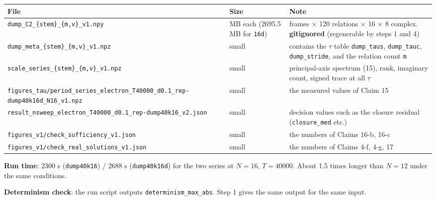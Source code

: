 \documentclass[
  10pt,
]{article}
\newcounter{none} %
\begin{document}
{\def\LTcaptype{none} %
\begin{longtable}[]{@{}
  >{\raggedright\arraybackslash}p{}
  >{\raggedright\arraybackslash}p{}
  >{\raggedright\arraybackslash}p{}@{}}
\toprule\noalign{}
\begin{minipage}[b]{\linewidth}\raggedright
File
\end{minipage} & \begin{minipage}[b]{\linewidth}\raggedright
Size
\end{minipage} & \begin{minipage}[b]{\linewidth}\raggedright
Note
\end{minipage} \\
\midrule\noalign{}
\endhead
\bottomrule\noalign{}
\endlastfoot
\texttt{dump\_C2\_\{stem\}\_\{m,v\}\_v1.npy} & 1268.6 MB each (2695.5 MB
for \texttt{16d}) & frames × 120 relations × 16 × 8 complex.
\textbf{gitignored} (regenerable by steps 1 and 4) \\
\texttt{dump\_meta\_\{stem\}\_\{m,v\}\_v1.npz} & small & contains the
\(\tau\) table \texttt{dump\_taus}, \texttt{dump\_tauc},
\texttt{dump\_stride}, and the relation count \texttt{m} \\
\texttt{scale\_series\_\{stem\}\_\{m,v\}\_v1.npz} & small &
principal-axis spectrum (15), rank, imaginary count, signed trace at all
\(\tau\) \\
\texttt{figures\_tau/period\_series\_electron\_T40000\_d0.1\_rep-dump40k16d\_N16\_v1.npz}
& small & the measured values of Claim 15 \\
\texttt{result\_nsweep\_electron\_T40000\_d0.1\_rep-dump40k16\_v2.json}
& small & decision values such as the closure residual
(\texttt{closure\_med} etc.) \\
\texttt{figures\_v1/check\_sufficiency\_v1.json} & small & the numbers
of Claims 16-b, 16-c \\
\texttt{figures\_v1/check\_real\_solutions\_v1.json} & small & the
numbers of Claims 4-f, 4-g, 17 \\
\end{longtable}
}

\textbf{Run time}: 2300 s (\texttt{dump40k16}) / 2688 s
(\texttt{dump40k16d}) for the two series at \(N=16\), \(T=40000\). About
1.5 times longer than \(N=12\) under the same conditions.

\textbf{Determinism check}: the run script outputs
\texttt{determinism\_max\_abs}. Step 1 gives the same output for the
same input.
\end{document}
